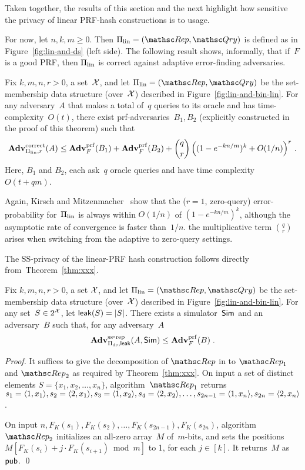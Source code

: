 Taken together, the results of this section and the next highlight how sensitive the privacy of linear PRF-hash constructions is to usage.


For now, let $n,k,m \geq 0$.  Then $\setprim_{\mathrm{lin}}= (\Rep, \Qry)$ is defined as in Figure~\ref{fig:lin-and-ds} (left side).  The following result shows, informally, that if~$F$ is a good PRF, then $\Pi_{\mathrm{lin}}$ is correct against adaptive error-finding adversaries.

\begin{theorem}\label{thm1}\label{thm:lin-correctness}
Fix $k,m,n,r>0$, a set~${\cal X}$, and let $\setprim_{\mathrm{lin}}= (\Rep, \Qry)$ be the set-membership data structure (over~${\cal X}$) described in Figure~\ref{fig:lin-and-bin-lin}.  For any adversary~$A$ that makes a total of~$q$ queries to its oracle and has time-complexity~$O(t)$, there exist prf-adversaries~$B_1,B_2$ (explicitly constructed in the proof of this theorem) such that
\[
\mathrm{\mathbf{Adv}}^{\mathrm{correct}}_{\Pi_{\mathrm{lin}},r}(A) \leq  \mathbf{Adv}^{\mathrm{prf}}_{F}(B_1) + \mathbf{Adv}^{\mathrm{prf}}_{F}(B_2)  +{\dbinom{q}{r}} \left( (1-e^{-kn/m})^k + O(1/n) \right)^r\,.
\]
Here, $B_1$ and $B_2$, each ask~$q$ oracle queries and have time complexity~$O(t+qm)$.
\end{theorem}
Again, Kirsch and Mitzenmacher~\cite{xxx} show
that the ($r=1$, zero-query) error-probability for~$\Pi_\mathrm{lin}$ is
always within $O(1/n)$ of $(1-e^{-kn/m})^k$, although the asymptotic
rate of convergence is faster than~$1/n$.   
the multiplicative term $\binom{q}{r}$ arises when switching from the adaptive to zero-query settings.



The SS-privacy of the linear-PRF hash construction follows directly from~Theorem~\ref{thm:xxx}.
\begin{theorem}\label{thm:lin-privacy}
Fix $k,m,n,r>0$, a set ${\cal X}$, and let $\setprim_{\mathrm{lin}}= (\Rep, \Qry)$ be the set-membership data structure (over~${\cal X}$) described in Figure~\ref{fig:lin-and-bin-lin}. For any set~$S \in 2^{{\cal X}}$, let ${\sf leak}(S)=|S|$.  There exists a simulator~${\sf Sim}$ and an adversary~$B$ such that, for any adversary~$A$
\[
\mathrm{\mathbf{Adv}}^{\mathrm{ss\mbox{-}rep}}_{\Pi_{\mathrm{ds}},{\sf leak}}(A,{\sf Sim}) \leq  \mathbf{Adv}^{\mathrm{prf}}_{F}(B)\;.
\]
\end{theorem}
\begin{proof}
It suffices to give the decomposition of $\Rep$ in to $\Rep_1$ and $\Rep_2$ as required by Theorem~\ref{thm:xxx}.
On input a set of distinct elements
$S=\{x_1,x_2,\ldots,x_n\}$, algorithm~$\Rep_1$ returns $s_1=\langle 1,x_1 \rangle, s_2=\langle 2,x_1 \rangle, s_3 = \langle 1,x_2\rangle, s_4=\langle 2,x_2 \rangle,\ldots,\linebreak s_{2n-1}=\langle 1,x_n \rangle, s_{2n}=\langle 2,x_n \rangle$.

On input $n,F_K(s_1),F_K(s_2),\ldots,F_K(s_{2n-1}) , F_K(s_{2n})$, algorithm $\Rep_2$ initializes an all-zero array~$M$ of~$m$-bits, and sets the positions $M[F_K(s_i)+j\cdot F_K(s_{i+1})\bmod m]$ to 1, for each $j \in [k]$.  It returns~$M$ as ${\sf pub}$. \hfill\qed
\end{proof}


